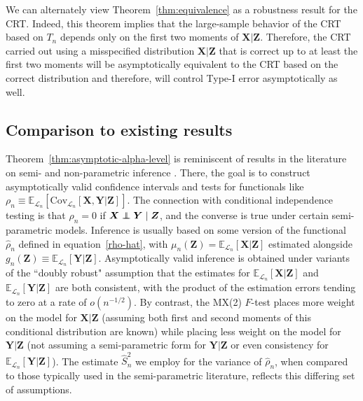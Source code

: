 \documentclass[12pt]{article}
\theoremstyle{definition}
\theoremstyle{remark}
\def\independenT#1#2{\mathrel{\rlap{$#1#2$}\mkern2mu{#1#2}}}
\newcommand\independent{\protect\mathpalette{\protect\independenT}{\perp}}
\newcommand{\prx}{\bm X}
\newcommand{\prz}{\bm Z}
\newcommand{\pry}{{\bm Y}}
\begin{document}
We can alternately view Theorem~\ref{thm:equivalence} as a robustness result for the CRT. Indeed, this theorem implies that the large-sample behavior of the CRT based on $T_n$ depends only on the first two moments of $\prx|\prz$. Therefore, the CRT carried out using a misspecified distribution $\prx|\prz$ that is correct up to at least the first two moments will be asymptotically equivalent to the CRT based on the correct distribution and therefore, will control Type-I error asymptotically as well.

\subsection{Comparison to existing results} \label{sec:comparison-to-existing-results-3}

Theorem~\ref{thm:asymptotic-alpha-level} is reminiscent of results in the literature on semi- and non-parametric inference \cite{Robinson1988,Robins1992,VanderLaan2011, Chernozhukov2018, Shah2018}. There, the goal is to construct asymptotically valid confidence intervals and tests for functionals like $\rho_n \equiv \mathbb E_{\mathcal L_n}[\text{Cov}_{\mathcal L_n}[\prx, \pry|\prz]]$. The connection with conditional independence testing is that $\rho_n = 0$ if $\prx \independent \pry \mid \prz$, and the converse is true under certain semi-parametric models. Inference is usually based on some version of the functional $\widehat \rho_n$ defined in equation~\eqref{rho-hat}, with $\mu_n(\prz) = \mathbb E_{\mathcal L_n}[\prx|\prz]$ estimated alongside $g_n(\prz) \equiv \mathbb E_{\mathcal L_n}[\pry|\prz]$. Asymptotically valid inference is obtained under variants of the ``doubly robust" assumption that the estimates for $\mathbb E_{\mathcal L_n}[\prx|\prz]$ and $\mathbb E_{\mathcal L_n}[\pry|\prz]$ are both consistent, with the product of the estimation errors tending to zero at a rate of $o(n^{-1/2})$. By contrast, the MX(2) $F$-test places more weight on the model for $\prx|\prz$ (assuming both first and second moments of this conditional distribution are known) while placing less weight on the model for $\pry|\prz$ (not assuming a semi-parametric form for $\pry|\prz$ or even consistency for $\mathbb E_{\mathcal L_n}[\pry|\prz]$). The estimate $\widehat S_n^2$ we employ for the variance of $\widehat \rho_n$, when compared to those typically used in the semi-parametric literature, reflects this differing set of assumptions.
\end{document}
